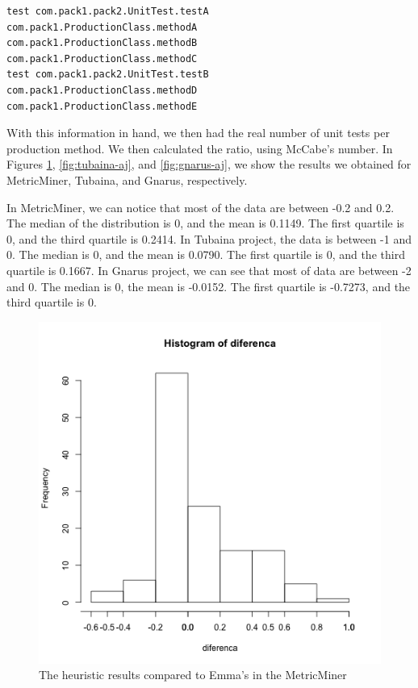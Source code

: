 \documentclass{sig-alternate}
\begin{document}
\begin{lstlisting}
test com.pack1.pack2.UnitTest.testA
com.pack1.ProductionClass.methodA
com.pack1.ProductionClass.methodB
com.pack1.ProductionClass.methodC
test com.pack1.pack2.UnitTest.testB
com.pack1.ProductionClass.methodD
com.pack1.ProductionClass.methodE
\end{lstlisting}

With this information in hand, we then had the real number of unit tests per production method. We then
calculated the ratio, using McCabe's number. In Figures \ref{fig:metricminer-aj}, \ref{fig:tubaina-aj}, and
\ref{fig:gnarus-aj}, we show the results we obtained for MetricMiner, Tubaina, and Gnarus, respectively. 

In MetricMiner, we can notice that most of the data are between -0.2 and 0.2. 
The median of the distribution is 0, and the mean is 0.1149. The first quartile is 0, and the
third quartile is 0.2414.
In Tubaina project, the data is between
-1 and 0. The median is 0, and the mean is 0.0790. The first quartile is
0, and the third quartile is 0.1667. 
In Gnarus project, we can see that most of data
are between -2 and 0. The median is 0, the mean is -0.0152. The first quartile
is -0.7273, and the third quartile is 0.


\begin{figure}[h!H]
  \centering
  \includegraphics[scale=0.28]{../stats/metricminer-histograma-aspectj.png}
  \caption{The heuristic results compared to Emma's in the MetricMiner}
  \label{fig:metricminer-aj}
\end{figure}
\end{document}
